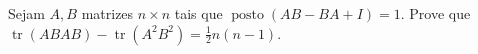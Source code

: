Sejam \(A, B\) matrizes \(n \times n\) tais que \(\operatorname{posto}(AB-BA+I) = 1.\) Prove que \(\operatorname{tr}(ABAB)-\operatorname{tr}(A^2 B^2) = \frac{1}{2}n(n-1).\)
